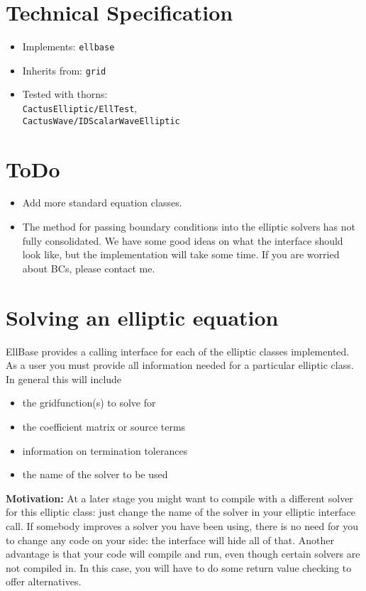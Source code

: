 \documentclass{article}
\begin{document}
\section{Technical Specification}

\begin{itemize}

\item{Implements:} {\tt ellbase}
\item{Inherits from:} {\tt grid}
\item{Tested with thorns:} \\
{\tt CactusElliptic/EllTest},\\
 {\tt CactusWave/IDScalarWaveElliptic}

\end{itemize}

\section{ToDo}
\begin{itemize}
\item{}Add more standard equation classes.
\item{}The method for passing  boundary conditions  into the 
elliptic solvers has not fully consolidated. We have some good ideas
on what the interface should look like, but the implementation will
take some time. If you are worried about BCs, please contact me.
\end{itemize}

\section{Solving an elliptic equation}
EllBase provides a calling interface for each of the elliptic classes 
implemented.
As a user you must provide all information needed for a
particular elliptic class.  In general this will include
\begin{itemize}
\item{} the gridfunction(s) to solve for
\item{} the coefficient matrix or source terms
\item{} information on termination tolerances
\item{} the name of the solver to be used
\end{itemize}

{\bf Motivation:} At a later stage you  might want to compile with a different 
solver for this elliptic class: just change the name of the solver in your
elliptic interface call. If somebody improves a solver you have been using,
there is no need for you to change any code on your side: the interface 
will hide all of that. Another advantage is that your code will compile 
and run, even though certain solvers are not compiled in. In this case, you 
will have to do some return value checking to offer alternatives.
\end{document}
